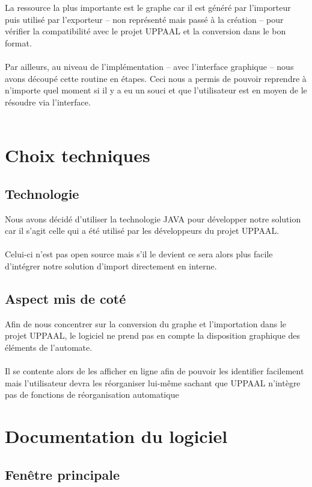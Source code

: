 \documentclass[12pt,a4paper]{report}
\begin{document}
La ressource la plus importante est le graphe car il est généré par l'importeur 
puis utilisé par l'exporteur -- non représenté mais passé à la création -- pour 
vérifier la compatibilité avec le projet UPPAAL et la conversion dans le bon format.
\\\\
Par ailleurs, au niveau de l'implémentation -- avec l'interface graphique -- nous 
avons découpé cette routine en étapes. Ceci nous a permis de pouvoir reprendre 
à n'importe quel moment si il y a eu un souci et que l'utilisateur est en moyen de 
le résoudre via l'interface.
\\\\

\section{Choix techniques}
\subsection*{Technologie}
Nous avons décidé d'utiliser la technologie JAVA pour développer notre 
solution car il s'agit celle qui a été utilisé par les développeurs du projet UPPAAL.
\\\\
Celui-ci n'est pas open source mais s'il le devient ce sera alors plus facile d'intégrer
notre solution d'import directement en interne.

\subsection*{Aspect mis de coté}
Afin de nous concentrer sur la conversion du graphe et l'importation dans le projet UPPAAL,
le logiciel ne prend pas en compte la disposition graphique des éléments de l'automate.
\\\\
Il se contente alors de les afficher en ligne afin de pouvoir les identifier facilement mais 
l'utilisateur devra les réorganiser lui-même sachant que UPPAAL n'intègre pas de fonctions de 
réorganisation automatique

\section{Documentation du logiciel}
\subsection{Fenêtre principale}
\end{document}
